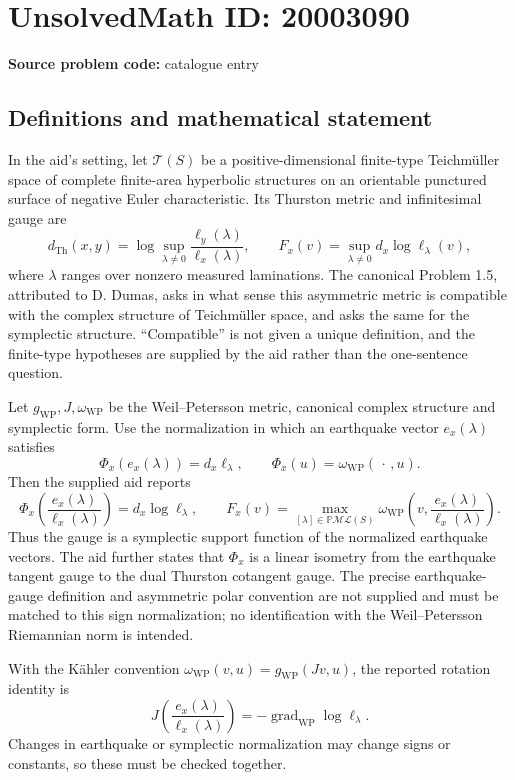 \documentclass[11pt]{article}
\begin{document}
\section*{UnsolvedMath ID: 20003090}
\textbf{Source problem code:} catalogue entry
\subsection{Definitions and mathematical statement}
In the aid's setting, let $\mathcal T(S)$ be a positive-dimensional finite-type Teichm\"uller space of complete finite-area hyperbolic structures on an orientable punctured surface of negative Euler characteristic. Its Thurston metric and infinitesimal gauge are
\[
 d_{\mathrm{Th}}(x,y)=\log\sup_{\lambda\ne0}
 \frac{\ell_y(\lambda)}{\ell_x(\lambda)},\qquad
 F_x(v)=\sup_{\lambda\ne0}d_x\log\ell_\lambda(v),
\]
where $\lambda$ ranges over nonzero measured laminations. The canonical Problem 1.5, attributed to D. Dumas, asks in what sense this asymmetric metric is compatible with the complex structure of Teichm\"uller space, and asks the same for the symplectic structure. ``Compatible'' is not given a unique definition, and the finite-type hypotheses are supplied by the aid rather than the one-sentence question.

Let $g_{\mathrm{WP}},J,\omega_{\mathrm{WP}}$ be the Weil--Petersson metric, canonical complex structure and symplectic form. Use the normalization in which an earthquake vector $e_x(\lambda)$ satisfies
\[
 \Phi_x(e_x(\lambda))=d_x\ell_\lambda,
 \qquad\Phi_x(u)=\omega_{\mathrm{WP}}(\,\cdot\,,u).
\]
Then the supplied aid reports
\[
 \Phi_x\!\left(\frac{e_x(\lambda)}{\ell_x(\lambda)}\right)
 =d_x\log\ell_\lambda,
 \qquad
 F_x(v)=\max_{[\lambda]\in\mathbb P\mathcal{ML}(S)}
 \omega_{\mathrm{WP}}\!\left(v,
       \frac{e_x(\lambda)}{\ell_x(\lambda)}\right).
\]
Thus the gauge is a symplectic support function of the normalized earthquake vectors. The aid further states that $\Phi_x$ is a linear isometry from the earthquake tangent gauge to the dual Thurston cotangent gauge. The precise earthquake-gauge definition and asymmetric polar convention are not supplied and must be matched to this sign normalization; no identification with the Weil--Petersson Riemannian norm is intended.

With the K\"ahler convention $\omega_{\mathrm{WP}}(v,u)=g_{\mathrm{WP}}(Jv,u)$, the reported rotation identity is
\[
 J\!\left(\frac{e_x(\lambda)}{\ell_x(\lambda)}\right)
 =-\operatorname{grad}_{\mathrm{WP}}\log\ell_\lambda.
\]
Changes in earthquake or symplectic normalization may change signs or constants, so these must be checked together.
\end{document}
